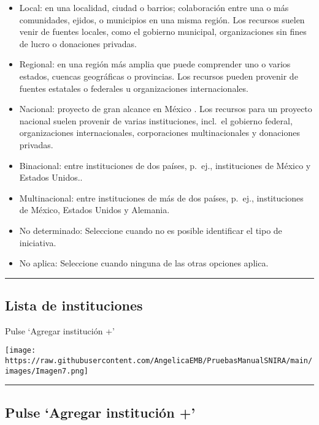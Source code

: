 \documentclass[
]{book}
\providecommand{\tightlist}{%
  \setlength{\itemsep}{0pt}\setlength{\parskip}{0pt}}
\begin{document}
\begin{itemize}
\tightlist
\item
  Local: en una localidad, ciudad o barrios; colaboración entre una o más comunidades, ejidos, o municipios en una misma región. Los recursos suelen venir de fuentes locales, como el gobierno municipal, organizaciones sin fines de lucro o donaciones privadas.
\item
  Regional: en una región más amplia que puede comprender uno o varios estados, cuencas geográficas o provincias. Los recursos pueden provenir de fuentes estatales o federales u organizaciones internacionales.
\item
  Nacional: proyecto de gran alcance en México . Los recursos para un proyecto nacional suelen provenir de varias instituciones, incl.~el gobierno federal, organizaciones internacionales, corporaciones multinacionales y donaciones privadas.
\item
  Binacional: entre instituciones de dos países, p.~ej., instituciones de México y Estados Unidos..
\item
  Multinacional: entre instituciones de más de dos países, p.~ej., instituciones de México, Estados Unidos y Alemania.
\item
  No determinado: Seleccione cuando no es posible identificar el tipo de iniciativa.
\item
  No aplica: Seleccione cuando ninguna de las otras opciones aplica.
\end{itemize}

\begin{center}\rule{0.5\linewidth}{0.5pt}\end{center}

\hypertarget{lista-de-instituciones}{%
\subsection{Lista de instituciones}\label{lista-de-instituciones}}

Pulse `Agregar institución +'

\texttt{[image: https://raw.githubusercontent.com/AngelicaEMB/PruebasManualSNIRA/main/images/Imagen7.png]}

\begin{center}\rule{0.5\linewidth}{0.5pt}\end{center}

\hypertarget{pulse-agregar-instituciuxf3n}{%
\subsection*{Pulse `Agregar institución +'}\label{pulse-agregar-instituciuxf3n}}
\end{document}
